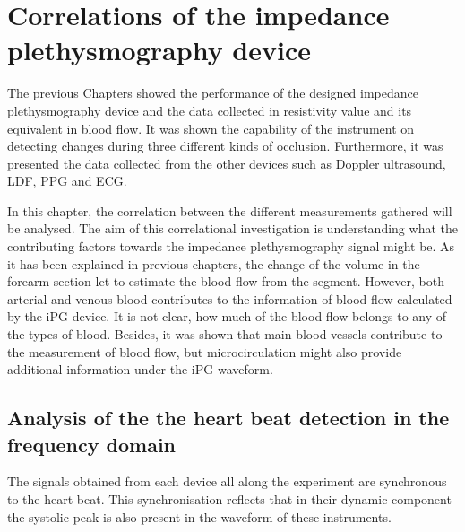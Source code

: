 
\chapter{Correlations of the impedance plethysmography device}  %
\label{chapter correlations}
\ifpdf
    \graphicspath{{Chapter10/Figs/Raster/}{Chapter10/Figs/PDF/}{Chapter10/Figs/}}
\else
    \graphicspath{{Chapter10/Figs/Vector/}{Chapter10/Figs/}}
\fi

The previous Chapters showed the performance of the designed impedance plethysmography device and the data collected in resistivity value and its equivalent in blood flow. It was shown the capability of the instrument on detecting changes during three different kinds of occlusion. Furthermore, it was presented the data collected from the other devices such as Doppler ultrasound, LDF, PPG and ECG. 

In this chapter, the correlation between the different measurements gathered will be analysed. The aim of this correlational investigation is understanding what the contributing factors towards the impedance plethysmography signal might be. As it has been explained in previous chapters, the change of the volume in the forearm section let to estimate the blood flow from the segment. However, both arterial and venous blood contributes to the information of blood flow calculated by the iPG device. It is not clear, how much of the blood flow belongs to any of the types of blood. Besides, it was shown that main blood vessels contribute to the measurement of blood flow, but microcirculation might also provide additional information under the iPG waveform. 

\section{Analysis of the the heart beat detection in the frequency domain} %
\label{section correlation 1} 
The signals obtained from each device all along the experiment are synchronous to the heart beat. This synchronisation reflects that in their dynamic component the systolic peak is also present in the waveform of these instruments.

